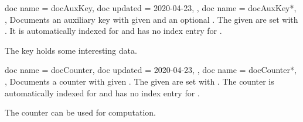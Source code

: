 \begin{docCommands}[doc parameter=\oarg{key path}\oarg{options}\marg{name}]
{
  {
    doc name    = docAuxKey,
    doc updated = 2020-04-23,
  },
  {
    doc name = docAuxKey*,
  },
}
Documents an auxiliary key with given  and an optional .
The given  are set with .
It is automatically indexed for 
and has no index entry for .
\begin{dispExample}
The key  holds some interesting data.
\end{dispExample}
\end{docCommands}



\begin{docCommands}[doc parameter=\oarg{options}\marg{name}]
{
  {
    doc name    = docCounter,
    doc updated = 2020-04-23,
  },
  {
    doc name = docCounter*,
  },
}
Documents a counter with given .
The given  are set with .
The counter is automatically indexed for 
and has no index entry for .
\begin{dispExample}
The counter  can be used for computation.
\end{dispExample}
\end{docCommands}







